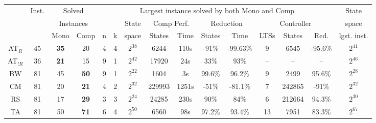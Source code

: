 \begin{table}[t]
    \centering
    {
    \scriptsize
    \begin{tabularx}{\textwidth}{|c|c|c|c|c|c|c|c|c|c|c|c|c|c|c|}
        \cline{1-15}
         & Inst. & \multicolumn{2}{c|}{Solved}  & \multicolumn{10}{c|}{Largest instance solved by both Mono and Comp} & State \\ 
         \cline{5-14}

         & & \multicolumn{2}{c|}{Instances}  &  &   & State &  \multicolumn{2}{c|}{Comp Perf.}  & \multicolumn{2}{c|}{Reduction}  & \multicolumn{3}{c|}{Controller} & space\\

         \cline{3-4} \cline{8-14}
         & & Mono & Comp & n & k & space & States & Time & States & Time & LTSs & States & Red. & lgst. inst.\\
      \cline{1-15}
        
        AT$_R$ & 45 & \textbf{35} & 20 & 4 & 4 & $2^{38}$ & 6244 & 110s & -91\% %
        & -99.63\% %
        & 9 & 6545 & -95.6\%  & $2^{41}$ \\  \cline{1-15}

        AT$_{!R}$ & 36 & \textbf{21} & 15 & 9 & 1 & $2^{42}$ & 17920 & 24s & 33\%  
        & 93\% %
        & -- & -- & --  & $2^{46}$ \\ \cline{1-15}
        
        BW & 81 & 45 & \textbf{50} & 9 & 1 & $2^{22}$ & 1604 & 3s
        & 99.6\% & 96.2\% & 9 & 2499 & 95.6\% & $2^{28}$ \\ 
        \cline{1-15}

        CM & 81 & 20 & \textbf{21} & 4 & 2 & $2^{32}$ & 229993 & 1251s & -51\% & -81.1\% & 7 & 242865 & -91\% & $2^{32}$ \\ 
        \cline{1-15}
        
        RS & 81 & 17 & \textbf{29} & 3 & 3 & $2^{24}$ & 24285 & 230s & 90\% & 84\% & 6 & 212664 & 94.3\% & $2^{30}$ \\ 
        \cline{1-15}

        TA & 81 & 50 & \textbf{71} & 6 & 4 & $2^{50}$ & 6560 & 98s &  97.2\% & 93.4\% & 13 & 7951 & 83.3\% & $2^{67}$ \\ \cline{1-15}
        

\end{tabularx}}
\end{table}

